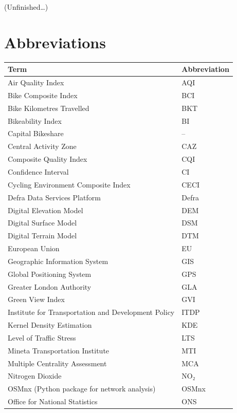 \documentclass[
  12pt,
  oneside]{book}
\begin{document}
(Unfinished\ldots)

\setcounter{tocdepth}{3}
\tableofcontents
\listoffigures
\listoftables

\chapter*{Abbreviations}\label{abbreviations}

\begin{table}
\centering
\begin{tabular}{ll}
\toprule
\textbf{Term} & \textbf{Abbreviation}\\
\midrule
Air Quality Index & AQI\\
Bike Composite Index & BCI\\
Bike Kilometres Travelled & BKT\\
Bikeability Index & BI\\
Capital Bikeshare & –\\
\addlinespace
Central Activity Zone & CAZ\\
Composite Quality Index & CQI\\
Confidence Interval & CI\\
Cycling Environment Composite Index & CECI\\
Defra Data Services Platform & Defra\\
\addlinespace
Digital Elevation Model & DEM\\
Digital Surface Model & DSM\\
Digital Terrain Model & DTM\\
European Union & EU\\
Geographic Information System & GIS\\
\addlinespace
Global Positioning System & GPS\\
Greater London Authority & GLA\\
Green View Index & GVI\\
Institute for Transportation and Development Policy & ITDP\\
Kernel Density Estimation & KDE\\
\addlinespace
Level of Traffic Stress & LTS\\
Mineta Transportation Institute & MTI\\
Multiple Centrality Assessment & MCA\\
Nitrogen Dioxide & NO₂\\
OSMnx (Python package for network analysis) & OSMnx\\
\addlinespace
Office for National Statistics & ONS\\

\end{tabular}
\end{table}
\end{document}
